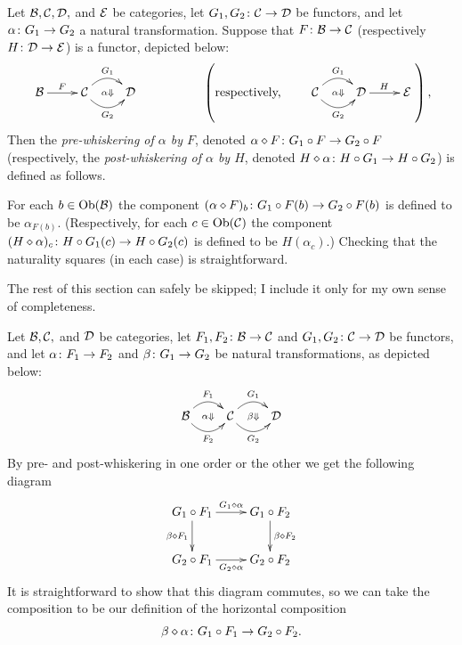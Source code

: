 \documentclass[CT4S-EN-RU]{subfiles}
\begin{document}
\begin{definitionENG}[Whiskering]\label{def:whiskering}
Let $\mathcal{B},\mathcal{C},\mathcal{D},$ and $\mathcal{E}$ be categories, let $G_1,G_2\colon\mathcal{C}\rightarrow\mathcal{D}$ be functors, and let $\alpha\colon G_1\rightarrow G_2$ a natural transformation. Suppose that $F\colon\mathcal{B}\rightarrow\mathcal{C}$ (respectively $H\colon\mathcal{D}\rightarrow\mathcal{E}$) is a functor, depicted below:
$$
\xymatrix{\mcB\ar[r]^F&\mcC\ar@{}[r]|{\alpha\Down}\ar@/^1pc/[r]^{G_1}\ar@/_1pc/[r]_{G_2}&\mcD}
\hspace{.7in}
\left(\tn{respectively,}\hsp\xymatrix{\mcC\ar@{}[r]|{\alpha\Down}\ar@/^1pc/[r]^{G_1}\ar@/_1pc/[r]_{G_2}&\mcD\ar[r]^H&\mcE}\right),
$$
Then the {\em pre-whiskering of $\alpha$ by $F$}, denoted $\alpha\diamond F\colon G_1\circ F\rightarrow G_2\circ F$ (respectively, the {\em post-whiskering of $\alpha$ by $H$}, denoted $H\diamond\alpha\colon H\circ G_1\rightarrow H\circ G_2$) is defined as follows.

For each $b\in\textnormal{Ob}(\mathcal{B})$ the component $(\alpha\diamond F)_b\colon G_1\circ F(b)\rightarrow G_2\circ F(b)$ is defined to be $\alpha_{F(b)}.$ (Respectively, for each $c\in\textnormal{Ob}(\mathcal{C})$ the component $(H\diamond\alpha)_c\colon H\circ G_1(c)\rightarrow H\circ G_2(c)$ is defined to be $H(\alpha_c).$) Checking that the naturality squares (in each case) is straightforward.
\end{definitionENG}

\begin{definitionRUS}[Whiskering]\label{def:whiskering}
\end{definitionRUS}

\begin{blockENG}
The rest of this section can safely be skipped; I include it only for my own sense of completeness.
\end{blockENG}

\begin{blockRUS}
\end{blockRUS}

\begin{definitionENG}\label{def:horizontal comp of nt}
Let $\mathcal{B},\mathcal{C},$ and $\mathcal{D}$ be categories, let $F_1,F_2\colon\mathcal{B}\rightarrow\mathcal{C}$ and $G_1,G_2\colon\mathcal{C}\rightarrow\mathcal{D}$ be functors, and let $\alpha\colon F_1\rightarrow F_2$ and $\beta\colon G_1\rightarrow G_2$ be natural transformations, as depicted below:
$$
\xymatrix{\mcB\ar@{}[r]|{\alpha\Down}\ar@/^1pc/[r]^{F_1}\ar@/_1pc/[r]_{F_2}&\mcC\ar@{}[r]|{\beta\Down}\ar@/^1pc/[r]^{G_1}\ar@/_1pc/[r]_{G_2}&\mcD}
$$
By pre- and post-whiskering in one order or the other we get the following diagram
$$
\xymatrix{
G_1\circ F_1\ar[r]^{G_1\diamond\alpha}\ar[d]_{\beta\diamond F_1}&G_1\circ F_2\ar[d]^{\beta\diamond F_2}\\
G_2\circ F_1\ar[r]_{G_2\diamond\alpha}&G_2\circ F_2}
$$
It is straightforward to show that this diagram commutes, so we can take the composition to be our definition of the horizontal composition 
$$\beta\diamond\alpha\colon G_1\circ F_1\rightarrow G_2\circ F_2.$$
\end{definitionENG}
\end{document}
